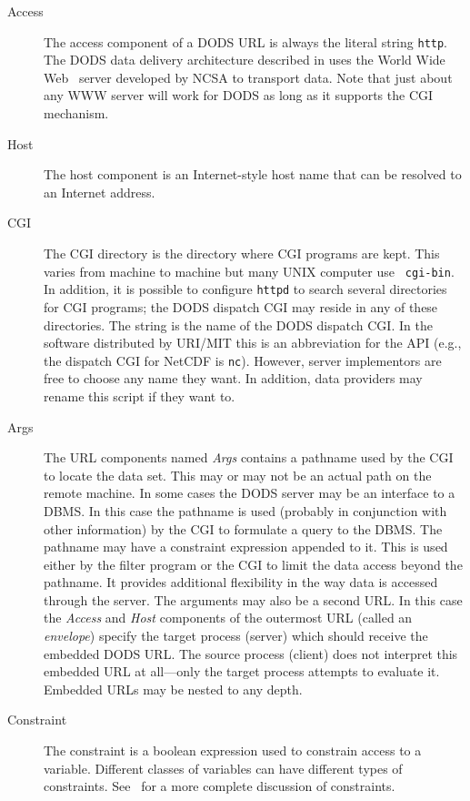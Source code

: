 \begin{description}

\item [Access] The access component of a DODS URL is always the literal
  string {\tt http}. The DODS data delivery architecture described in \DDA
  uses the World Wide Web \HTTPD\ server developed by NCSA to transport
  data. Note that just about any WWW server will work for DODS as long as it
  supports the CGI mechanism.

\item [Host] The host component is an Internet-style host name that
  can be resolved to an Internet address.
  
\item [CGI] The CGI directory is the directory where CGI programs are kept.
  This varies from machine to machine but many UNIX computer use {\tt
    cgi-bin}. In addition, it is possible to configure {\tt httpd} to search
  several directories for CGI programs; the DODS dispatch CGI may reside in
  any of these directories. The string is the name of the DODS dispatch
  CGI\@. In the software distributed by URI/MIT this is an abbreviation for
  the API (e.g., the dispatch CGI for NetCDF is {\tt nc}). However, server
  implementors are free to choose any name they want. In addition, data
  providers may rename this script if they want to.
  
\item [Args] The URL components named {\em Args\/} contains a pathname used
  by the CGI to locate the data set. This may or may not be an actual path on
  the remote machine. In some cases the DODS server may be an interface to a
  DBMS\@. In this case the pathname is used (probably in conjunction with
  other information) by the CGI to formulate a query to the DBMS\@. The
  pathname may have a constraint expression appended to it. This is used
  either by the filter program or the CGI to limit the data access beyond the
  pathname. It provides additional flexibility in the way data is accessed
  through the server. The arguments may also be a second URL\@. In this case
  the {\em Access\/} and {\em Host\/} components of the outermost URL (called
  an {\em envelope\/}) specify the target process (server) which should
  receive the embedded DODS URL\@. The source process (client) does not
  interpret this embedded URL at all---only the target process attempts to
  evaluate it.  Embedded URLs may be nested to any depth.

\item [Constraint] The constraint is a boolean expression used to constrain
  access to a variable. Different classes of variables can have different
  types of constraints. See~\API {} for a more complete
  discussion of constraints.

\end{description}

